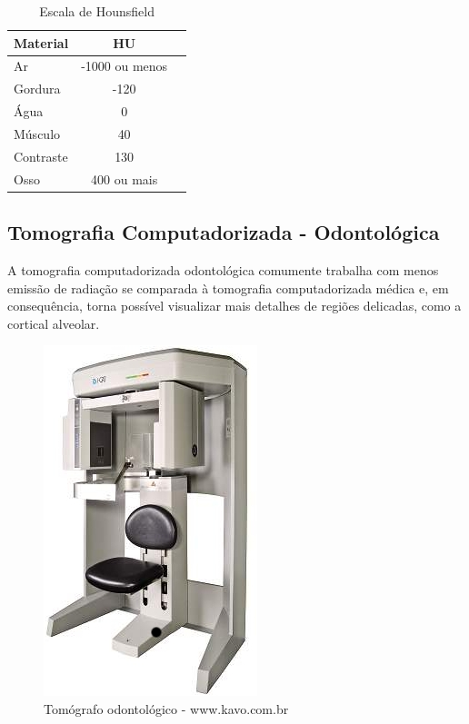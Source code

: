 \begin{table}[h]
\centering
\caption{Escala de Hounsfield}
\begin{tabular}{lcc}\\
\hline %
Material & HU\\
\hline
\hline
Ar & -1000 ou menos\\
Gordura & -120\\
Água & 0\\
Músculo & 40\\
Contraste & 130\\
Osso & 400 ou mais\\
\hline
\end{tabular}
\label{tab:escala_hounsfield}
\end{table}


\subsection{Tomografia Computadorizada - Odontológica}

A tomografia computadorizada odontológica comumente trabalha com menos emissão
de radiação se comparada à tomografia computadorizada médica e, em consequência,
torna possível visualizar mais detalhes de regiões delicadas, como a cortical alveolar.

\begin{figure}[!htb]
\centering
\includegraphics[scale=0.4]{img/feixe_conico.jpg}
\caption{Tomógrafo odontológico - www.kavo.com.br}
\end{figure}

